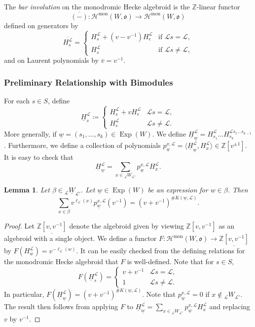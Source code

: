\documentclass{amsart}
\newcommand{\Z}{\mathbb{Z}}
\newcommand{\scrH}{\mathcal{H}}
\newcommand{\scrL}{\mathcal{L}}
\newcommand{\fr}[1]{\mathfrak{#1}}
\DeclareMathOperator{\mon}{mon}
\DeclareMathOperator{\Exp}{Exp}
\newcommand{\W}[2]{{}_{#1}W_{#2}}
\newcommand{\uW}[2]{{}_{#1}\underline{W}_{#2}}
\newcommand{\uw}{\underline{w}}
\newtheorem{lemma}[subsubsection]{Lemma}
\theoremstyle{definition}
\numberwithin{equation}{subsection}
\begin{document}
The \emph{bar involution} on the monodromic Hecke algebroid is the $\Z$-linear functor
\[\overline{(-)} : \scrH^{\mon} (W, \fr{o}) \to \scrH^{\mon} (W, \fr{o})\]
defined on generators by
\[\overline{H_s^{\scrL}} = \begin{cases} H_s^{\scrL} + (v - v^{-1}) H_e^{\scrL} & \text{if } \scrL s = \scrL, \\ H_s^{\scrL} & \text{if } \scrL s \neq \scrL, \end{cases}\]
and on Laurent polynomials by $\overline{v} = v^{-1}$.

\subsubsection{Preliminary Relationship with Bimodules}

For each $s \in S$, define 
\[ \underline{H}_s^{\scrL} \coloneq \begin{cases} H_s^{\scrL} + v H_e^{\scrL} & \scrL s = \scrL, \\ H_s^{\scrL} & \scrL s \neq \scrL. \end{cases}\]
More generally, if $\uw = (s_1, \ldots, s_k) \in \Exp (W)$. We define $\underline{H}_{\uw}^{\scrL} = H_{s_1}^{\scrL} \ldots H_{s_k}^{\scrL s_{1} \ldots s_{k-1}}$.
Furthermore, we define a collection of polynomials $p_{\uw}^{x, \scrL} = \langle \underline{H}_{\uw}^{\scrL},  H_x^{\scrL} \rangle  \in \Z [v^{\pm 1}]$.
It is easy to check that 
\[\underline{H}_{\uw}^{\scrL} = \sum_{x \in \W{\scrL}{\scrL'}} p_{\uw}^{x, \scrL} H_x^{\scrL}.\] 

\begin{lemma}\label{lem:pwx_calculation}
    Let $\beta \in \uW{\scrL}{\scrL'}$.
    Let $\uw \in \Exp (W)$ be an expression for $w \in \beta$. Then 
    \[ \sum_{x \in \beta } v^{\ell_{\scrL} (x)} p_{\uw}^{x, \scrL} (v^{-1}) = (v+v^{-1})^{\# K (\uw , \scrL)}.\]
\end{lemma}
\begin{proof}
    Let $\underline{\Z[v,v^{-1}]}$ denote the algebroid given by viewing $\Z[v,v^{-1}]$ as an algebroid with a single object.
    We define a functor $F : \scrH^{\mon} (W, \fr{o}) \to \underline{\Z[v,v^{-1}]}$ by $F(H_w^{\scrL}) = v^{-\ell_{\scrL} (w)}$.
    It can be easily checked from the defining relations for the monodromic Hecke algebroid that $F$ is well-defined.
    Note that for $s \in S$,
    \[F (\underline{H}_s^{\scrL}) = \begin{cases} v + v^{-1} & \scrL s = \scrL, \\ 1 & \scrL s \neq \scrL. \end{cases}\]
    In particular, $F (\underline{H}_{\uw}^{\scrL}) = (v+v^{-1})^{\# K(\uw, \scrL)}$.
    Note that $p_{\uw}^{x, \scrL} = 0$ if $x \notin \W{\scrL}{\scrL'}$.
    The result then follows from applying $F$ to $\underline{H}_{\uw}^{\scrL} = \sum_{x \in \W{\scrL}{\scrL'}} p_{\uw}^{x, \scrL} H_x^{\scrL}$ and replacing $v$ by $v^{-1}$.
\end{proof}
\end{document}

